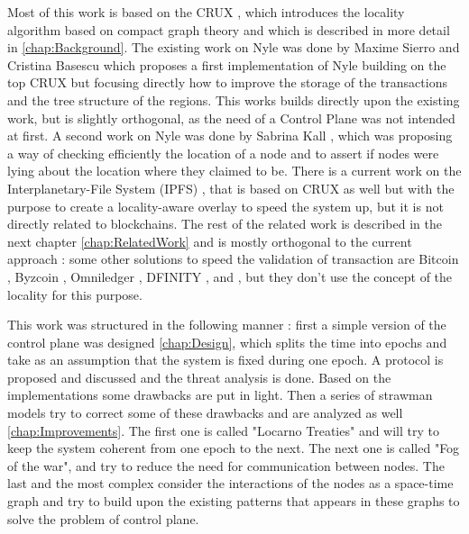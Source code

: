 \documentclass[a4paper,11pt,oneside]{report}
\begin{document}
Most of this work is based on the CRUX \cite{Basescu2014}, which introduces
the locality algorithm based on compact graph theory and which is described in
more detail in  \autoref{chap:Background}. The existing work on Nyle was done by
Maxime Sierro and Cristina Basescu \cite{Sierro2019} which proposes a first
implementation of Nyle building on the top CRUX \cite{Basescu2014} but focusing
directly how to improve the storage of the transactions and the tree structure
of the regions. This works builds directly upon the existing work, but is
slightly orthogonal, as the need of a Control Plane was not intended at first.
A  second work on Nyle was done by Sabrina Kall \cite{Kall2019}, which was
proposing a way of checking efficiently the location of a node and to assert if
nodes were lying about the location where they claimed to be. There is a
current work on the Interplanetary-File System (IPFS) \cite{Michel2019}, that is
based on CRUX as well but with the purpose to create a locality-aware overlay
to speed the system up, but it is not directly related to blockchains. The rest
of the related work is described in the next chapter \autoref{chap:RelatedWork} and
is mostly orthogonal to the current approach : some other solutions to speed
the validation of transaction are Bitcoin \cite{Nakamoto2009}, Byzcoin \cite{Kogias2016},
Omniledger \cite{Kokoris-Kogias2017},  DFINITY \cite{Hanke2018},
\cite{Wang2019} and \cite{Lokhava2019}, but they don't use the concept of the
locality for this purpose. 

This work was structured in the following manner : first a simple version of
the control plane was designed \autoref{chap:Design}, which splits the time into
epochs and take as an assumption that the system is fixed during one epoch. A
protocol is proposed and discussed and the threat analysis is done. Based on
the implementations some drawbacks are put in light. Then a series of strawman
models try to correct some of these drawbacks and are analyzed as well
\autoref{chap:Improvements}. The first one is called "Locarno Treaties" and will
try to keep the system coherent from one epoch to the next. The next one is
called "Fog of the war", and try to reduce the need for communication between
nodes. The last and the most complex consider the interactions of the nodes as
a space-time graph and try to build upon the existing patterns that appears in
these graphs to solve the problem of control plane. 

\end{document}
